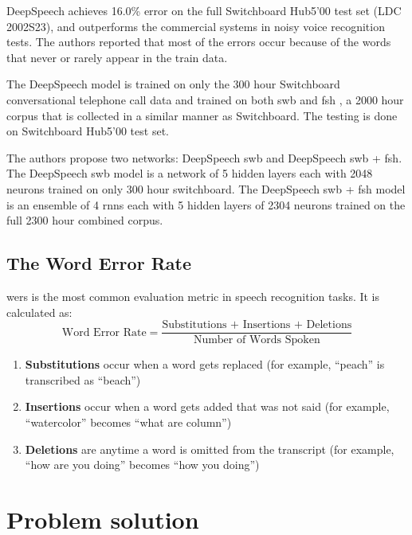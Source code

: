\documentclass[12pt]{article}
\begin{document}
DeepSpeech achieves 16.0\% error on the full Switchboard Hub5'00 test set (LDC 2002S23), and outperforms the  commercial systems in noisy voice recognition tests. The authors reported that most of the errors occur because of the words that never or rarely appear in the train data.

The DeepSpeech model is trained on only the 300 hour Switchboard conversational telephone call data and trained on both \gls{swb} and \gls{fsh} \cite{data_cite}, a 2000 hour corpus that is collected in a similar manner as Switchboard. The testing is done on Switchboard Hub5'00 test set.

The authors propose two networks: DeepSpeech \gls{swb} and DeepSpeech \gls{swb} + \gls{fsh}. The DeepSpeech \gls{swb} model is a network of 5 hidden layers each with 2048 neurons trained on only 300 hour switchboard. The DeepSpeech \gls{swb} + \gls{fsh} model is an ensemble of 4 \glspl{rnn} each with 5 hidden layers of 2304 neurons trained on the full 2300 hour combined corpus.



\subsection{The Word Error Rate}
\label{wer_section}
\glspl{wer} is the most common evaluation metric in speech recognition tasks. It is calculated as:
\begin{equation*}
    \text{Word Error Rate} = \frac{\text{Substitutions + Insertions + Deletions}}{\text{Number of Words Spoken}}
\end{equation*}

\begin{enumerate}
    \item \textbf{Substitutions} occur when a word gets replaced (for example, “peach” is transcribed as “beach”)
    \item \textbf{Insertions} occur when a word gets added that was not said (for example, “watercolor” becomes “what are column”)
    \item \textbf{Deletions} are anytime a word is omitted from the transcript (for example, “how are you doing” becomes “how you doing”)
\end{enumerate}

\section{Problem solution}
\end{document}
